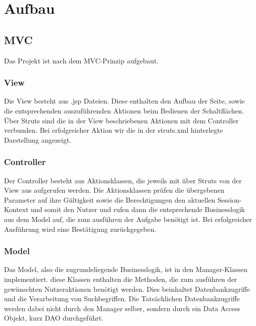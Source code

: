 \documentclass[12pt,a4paper]{article}
\begin{document}
	\section{Aufbau}
	\subsection{MVC}
	Das Projekt ist nach dem MVC-Prinzip aufgebaut.
	\subsubsection{View}
	Die View besteht aus .jsp Dateien. Diese enthalten den Aufbau der Seite, sowie die entsprechenden auszuführenden Aktionen beim Bedienen der Schaltflächen.
	Über Struts sind die in der View beschriebenen Aktionen mit dem Controller verbunden. Bei erfolgreicher Aktion wir die in der struts.xml hinterlegte Darstellung angezeigt.
	\subsubsection{Controller}
	Der Controller besteht aus Aktionsklassen, die jeweils mit über Struts von der View aus aufgerufen werden. Die Aktionsklassen prüfen die übergebenen Parameter auf ihre Gültigkeit sowie die Berechtigungen den aktuellen Session-Kontext und somit den Nutzer und rufen dann die entsprechende Businesslogik aus dem Model auf, die zum ausführen der Aufgabe benötigt ist. Bei erfolgreicher Ausführung wird eine Bestätigung zurückgegeben.
	\subsubsection{Model}
	Das Model, also die zugrundeliegende Businesslogik, ist in den Manager-Klassen implementiert. diese Klassen enthalten die Methoden, die zum ausführen der gewünschten Nutzeraktionen benötigt werden. Dies beinhaltet Datenbankzugriffe und die Verarbeitung von Suchbegriffen.
	Die Tatsächlichen Datenbankzugriffe werden dabei nicht durch den Manager selber, sondern durch ein Data Access Objekt, kurz DAO durchgeführt.
\end{document}
